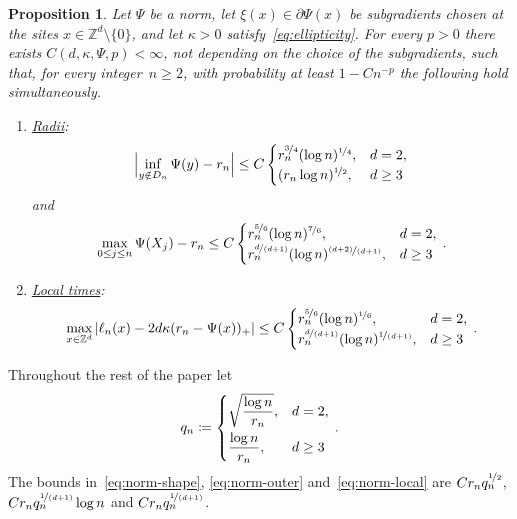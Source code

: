 \documentclass[11pt]{amsart}
\theoremstyle{plain}
\newtheorem{proposition}[theorem]{Proposition}
\theoremstyle{definition}
\newcommand{\Z}{\mathbb Z}
\newcommand{\drift}{\kappa}
\newcommand{\gauge}{\Psi}
\newcommand{\nf}{\nicefrac}
\numberwithin{equation}{section}
\begin{document}
\begin{proposition}\label{prop:norm-shape}
Let $\gauge$ be a norm, let $\xi(x)\in\partial \gauge(x)$ be subgradients chosen at the sites $x\in\Z^d\setminus\{0\}$, and let $\drift>0$ satisfy~\eqref{eq:ellipticity}. For every $p>0$ there exists $C(d,\drift,\gauge,p)<\infty$, not depending on the choice of the subgradients, such that, for every integer~$n\geq2$, with probability at least $1-Cn^{-p}$ the following hold simultaneously.
\begin{enumerate}[label=\textup{(\roman*)}]
\item \underline{\emph{Radii}}:
\begin{equation}\label{eq:norm-shape}
\Bigl|\inf_{y\notin D_n}\gauge(y)-r_n\Bigr|\leq C\begin{cases}r_n^{\nf34}(\log n)^{\nf14},&d=2,\\(r_n\log n)^{\nf12},&d\geq3\end{cases}
\end{equation}
and
\begin{equation}\label{eq:norm-outer}
\max_{0\leq j\leq n}\gauge(X_j)-r_n\leq C\begin{cases}r_n^{\nf56}(\log n)^{\nf76},&d=2,\\r_n^{\nf{d}{(d+1)}}(\log n)^{\nf{(d+2)}{(d+1)}},&d\geq3\end{cases}\, .
\end{equation}
\item \underline{\emph{Local times}}:
\begin{equation}\label{eq:norm-local}
\max_{x\in\Z^d}|\ell_n(x)-2d\drift(r_n-\gauge(x))_+|\leq C\begin{cases}r_n^{\nf56}(\log n)^{\nf16},&d=2,\\r_n^{\nf{d}{(d+1)}}(\log n)^{\nf{1}{(d+1)}},&d\geq3\end{cases}\, .
\end{equation}
\end{enumerate}
\end{proposition}

Throughout the rest of the paper let
\begin{equation}\label{eq:qn}
q_n\coloneqq\begin{dcases}\sqrt{\frac{\log n}{r_n}},&d=2,\\\frac{\log n}{r_n},&d\geq3\end{dcases}\, .
\end{equation}
The bounds in~\eqref{eq:norm-shape}, \eqref{eq:norm-outer} and~\eqref{eq:norm-local} are $Cr_nq_n^{\nf12}$, $Cr_nq_n^{\nf{1}{(d+1)}}\log n$ and $Cr_nq_n^{\nf{1}{(d+1)}}$.
\end{document}
